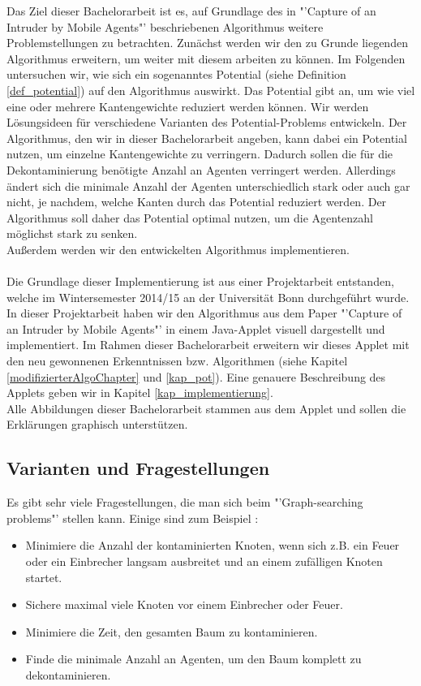 Das Ziel dieser Bachelorarbeit ist es, auf Grundlage des in "'Capture of an Intruder by Mobile Agents"' \cite{cima_paper} beschriebenen Algorithmus weitere Problemstellungen zu betrachten. Zunächst werden wir den zu Grunde liegenden Algorithmus erweitern, um weiter mit diesem arbeiten zu können. Im Folgenden untersuchen wir, wie sich ein sogenanntes Potential (siehe Definition \ref{def_potential}) auf den Algorithmus auswirkt. Das Potential gibt an, um wie viel eine oder mehrere Kantengewichte reduziert werden können. Wir werden Lösungsideen für verschiedene Varianten des Potential-Problems entwickeln. Der Algorithmus, den wir in dieser Bachelorarbeit angeben, kann dabei ein Potential nutzen, um einzelne Kantengewichte zu verringern. Dadurch sollen die für die Dekontaminierung benötigte Anzahl an Agenten verringert werden. Allerdings ändert sich die minimale Anzahl der Agenten unterschiedlich stark oder auch gar nicht, je nachdem, welche Kanten durch das Potential reduziert werden. Der Algorithmus soll daher das Potential optimal nutzen, um die Agentenzahl möglichst stark zu senken.\\
Außerdem werden wir den entwickelten Algorithmus implementieren.
\\
\\
Die Grundlage dieser Implementierung ist aus einer Projektarbeit entstanden, welche im Wintersemester 2014/15 an der Universität Bonn durchgeführt wurde.
In dieser Projektarbeit haben wir den Algorithmus aus dem Paper "'Capture of an Intruder by Mobile Agents"' \cite{cima_paper} in einem Java-Applet visuell dargestellt und implementiert. Im Rahmen dieser Bachelorarbeit erweitern wir dieses Applet mit den neu gewonnenen Erkenntnissen bzw. Algorithmen (siehe Kapitel \ref{modifizierterAlgoChapter} und \ref{kap_pot}). Eine genauere Beschreibung des Applets geben wir in Kapitel \ref{kap_implementierung}.\\
Alle Abbildungen dieser Bachelorarbeit stammen aus dem Applet und sollen die Erklärungen graphisch unterstützen.



\subsection{Varianten und Fragestellungen}


Es gibt sehr viele Fragestellungen, die man sich beim "'Graph-searching problems"' stellen kann. Einige sind zum Beispiel \cite{firefighterproblem_paper}:
\begin{itemize}
	\item Minimiere die Anzahl der kontaminierten Knoten, wenn sich z.B. ein Feuer oder ein Einbrecher langsam ausbreitet und an einem zufälligen Knoten startet.
	\item Sichere maximal viele Knoten vor einem Einbrecher oder Feuer.
	\item Minimiere die Zeit, den gesamten Baum zu kontaminieren.
	\item Finde die minimale Anzahl an  Agenten, um den Baum komplett zu dekontaminieren.
\end{itemize}

